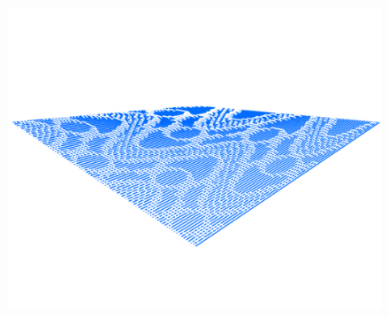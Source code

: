 ﻿%
\begin{figure}[H]
	\centering
	\includegraphics[width=\linewidth]{src/graphics/dynamic-metamorphosis--ideas-form-b.jpg}
	\label{
		fig:dynamic-metamorphosis--ideas-form-b
	}
\end{figure}
